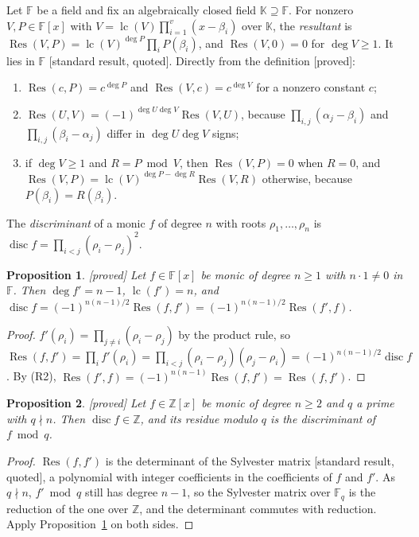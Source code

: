 \documentclass[10pt,a4paper]{article}
\newcommand{\F}{\mathbb{F}}
\newcommand{\Fq}{\mathbb{F}_q}
\newcommand{\Z}{\mathbb{Z}}
\newcommand{\K}{\mathbb{K}}
\DeclareMathOperator{\Res}{Res}
\DeclareMathOperator{\disc}{disc}
\DeclareMathOperator{\lc}{lc}
\newcommand{\stproved}{\textsf{\small[proved]}\xspace}
\newcommand{\stquoted}{\textsf{\small[standard result, quoted]}\xspace}
\theoremstyle{plain}
\newtheorem{proposition}{Proposition}
\theoremstyle{definition}
\begin{document}
Let $\F$ be a field and fix an algebraically closed field $\K\supseteq\F$.  For nonzero $V,P\in\F[x]$ with $V=\lc(V)\prod_{i=1}^{v}(x-\beta_i)$ over $\K$, the
\emph{resultant} is $\Res(V,P)=\lc(V)^{\deg P}\prod_{i}P(\beta_i)$, and $\Res(V,0)=0$ for $\deg V\ge1$.  It lies in $\F$ \stquoted \cite[Chapter~IV]{lang}.  Directly
from the definition \stproved:
\begin{enumerate}[label=(R\arabic*)]
\item $\Res(c,P)=c^{\deg P}$ and $\Res(V,c)=c^{\deg V}$ for a nonzero constant $c$;
\item $\Res(U,V)=(-1)^{\deg U\deg V}\Res(V,U)$, because $\prod_{i,j}(\alpha_j-\beta_i)$ and $\prod_{i,j}(\beta_i-\alpha_j)$ differ in $\deg U\deg V$ signs;
\item if $\deg V\ge1$ and $R=P\bmod V$, then $\Res(V,P)=0$ when $R=0$, and $\Res(V,P)=\lc(V)^{\deg P-\deg R}\Res(V,R)$ otherwise, because $P(\beta_i)=R(\beta_i)$.
\end{enumerate}
The \emph{discriminant} of a monic $f$ of degree $n$ with roots $\rho_1,\dots,\rho_n$ is $\disc f=\prod_{i<j}(\rho_i-\rho_j)^2$.

\begin{proposition}\label{prop:F1}\stproved
Let $f\in\F[x]$ be monic of degree $n\ge1$ with $n\cdot1\neq0$ in $\F$.  Then $\deg f'=n-1$, $\lc(f')=n$, and $\disc f=(-1)^{n(n-1)/2}\Res(f,f')=(-1)^{n(n-1)/2}\Res(f',f)$.
\end{proposition}
\begin{proof}
$f'(\rho_i)=\prod_{j\neq i}(\rho_i-\rho_j)$ by the product rule, so $\Res(f,f')=\prod_if'(\rho_i)=\prod_{i<j}(\rho_i-\rho_j)(\rho_j-\rho_i)=(-1)^{n(n-1)/2}\disc f$.
By (R2), $\Res(f',f)=(-1)^{n(n-1)}\Res(f,f')=\Res(f,f')$.
\end{proof}

\begin{proposition}\label{prop:reduction}\stproved
Let $f\in\Z[x]$ be monic of degree $n\ge2$ and $q$ a prime with $q\nmid n$.  Then $\disc f\in\Z$, and its residue modulo $q$ is the discriminant of $f\bmod q$.
\end{proposition}
\begin{proof}
$\Res(f,f')$ is the determinant of the Sylvester matrix \stquoted \cite[Section~3.3]{cohen}, a polynomial with integer coefficients in the coefficients of $f$
and $f'$.  As $q\nmid n$, $f'\bmod q$ still has degree $n-1$, so the Sylvester matrix over $\Fq$ is the reduction of the one over $\Z$, and the determinant
commutes with reduction.  Apply Proposition~\ref{prop:F1} on both sides.
\end{proof}
\end{document}
